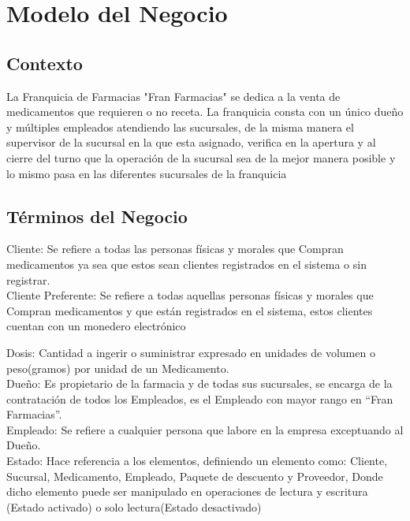 \chapter{Modelo del Negocio}
\section{Contexto}
La Franquicia de Farmacias "Fran Farmacias" se dedica a la venta de medicamentos que requieren o no receta. La franquicia consta con un único dueño y múltiples empleados atendiendo las sucursales, de la misma manera el supervisor de la sucursal en la que esta asignado, verifica en la apertura y al cierre del turno que la operación de la sucursal sea de la mejor manera posible y lo mismo pasa en las diferentes sucursales de la franquicia\\

\section{Términos del Negocio}

Cliente: Se refiere a todas las personas físicas y morales que Compran medicamentos ya sea que estos sean clientes registrados en el sistema o sin registrar.\\

Cliente Preferente: Se refiere a todas aquellas personas físicas y morales que Compran medicamentos y que están registrados en el sistema, estos clientes cuentan con un monedero electrónico



Dosis: Cantidad a ingerir o suministrar expresado en unidades de volumen o peso(gramos) por unidad de un Medicamento.\\

Dueño: Es propietario de la farmacia y de todas sus sucursales, se encarga de la contratación de todos los Empleados, es el Empleado con mayor rango en “Fran Farmacias”.\\

Empleado: Se refiere a cualquier persona que labore en la empresa exceptuando al Dueño.\\

Estado: Hace referencia a los elementos, definiendo un elemento como: Cliente, Sucursal, Medicamento, Empleado, Paquete de descuento y Proveedor, Donde dicho elemento puede ser manipulado en operaciones de lectura y escritura (Estado activado) o solo lectura(Estado desactivado)\\

